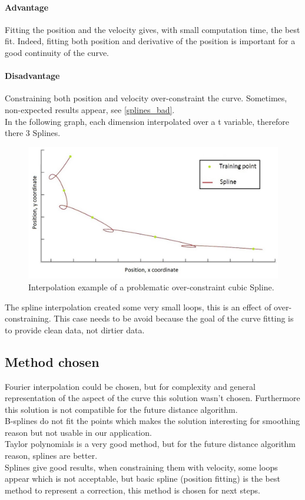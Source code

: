 \paragraph*{Advantage}

Fitting the position and the velocity gives, with small computation time, the best fit. Indeed, fitting both position and derivative of the position is important for a good continuity of the curve.

\paragraph*{Disadvantage}

Constraining both position and velocity over-constraint the curve. Sometimes, non-expected results appear, see \autoref{splines_bad}.\\
In the following graph, each dimension interpolated over a t variable, therefore there 3 Splines.

\begin{figure}[H]
\centering
\includegraphics[width=13cm]{img/splines_bad.jpg}
\caption{Interpolation example of a problematic over-constraint cubic Spline.}
\label{splines_bad}
\end{figure}

The spline interpolation created some very small loops, this is an effect of over-constraining. This case needs to be avoid because the goal of the curve fitting is to provide clean data, not dirtier data.

\subsection{Method chosen}

Fourier interpolation could be chosen, but for complexity and general representation of the aspect of the curve this solution wasn't chosen. Furthermore this solution is not compatible for the future distance algorithm.\\
B-splines do not fit the points which makes the solution interesting for smoothing reason but not usable in our application.\\
Taylor polynomials is a very good method, but for the future distance algorithm reason, splines are better. \\
Splines give good results, when constraining them with velocity, some loops appear which is not acceptable, but basic spline (position fitting) is the best method to represent a correction, this method is chosen for next steps.

